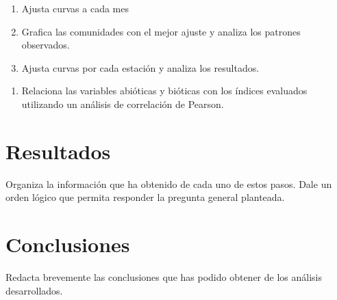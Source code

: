 \documentclass[]{book}
\providecommand{\tightlist}{%
  \setlength{\itemsep}{0pt}\setlength{\parskip}{0pt}}
\begin{document}
\begin{enumerate}
\def\labelenumi{\alph{enumi}.}
\tightlist
\item
  Ajusta curvas a cada mes
\item
  Grafica las comunidades con el mejor ajuste y analiza los patrones
  observados.
\item
  Ajusta curvas por cada estación y analiza los resultados.
\end{enumerate}

\begin{enumerate}
\def\labelenumi{\arabic{enumi}.}
\setcounter{enumi}{5}
\tightlist
\item
  Relaciona las variables abióticas y bióticas con los índices evaluados
  utilizando un análisis de correlación de Pearson.
\end{enumerate}

\section{Resultados}\label{resultados}

Organiza la información que ha obtenido de cada uno de estos pasos. Dale
un orden lógico que permita responder la pregunta general planteada.

\section{Conclusiones}\label{conclusiones}

Redacta brevemente las conclusiones que has podido obtener de los
análisis desarrollados.


\end{document}
